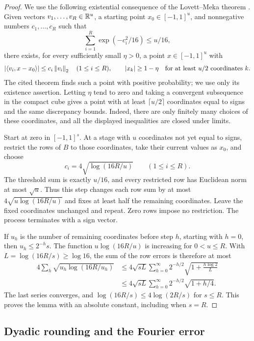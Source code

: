 \begin{proof}
We use the following existential consequence of the Lovett--Meka theorem
\cite[Theorem~4 of arXiv:1203.5747v2]{LovettMeka2015}.
Given vectors $v_1,\ldots,v_R\in\mathbb R^u$, a starting point
$x_0\in[-1,1]^u$, and
nonnegative numbers $c_1,\ldots,c_R$ such that
\[
 \sum_{i=1}^R\exp(-c_i^2/16)\le u/16,
\]
there exists, for every sufficiently small $\eta>0$, a point
$x\in[-1,1]^u$ with
\[
 |\langle v_i,x-x_0\rangle|\le c_i\left\lVert v_i\right\rVert_2
 \quad(1\le i\le R),
 \qquad
 |x_k|\ge1-\eta\quad\text{for at least }u/2\text{ coordinates }k.
\]
The cited theorem finds such a point with positive probability; we use
only its existence assertion.  Letting $\eta$ tend to zero and taking a
convergent subsequence in the compact cube gives a
point with at least $\lceil u/2\rceil$ coordinates equal to signs and the
same discrepancy bounds.  Indeed, there are only finitely many choices
of these coordinates, and all the displayed inequalities are closed
under limits.

Start at zero in $[-1,1]^s$.  At a stage with $u$ coordinates not yet
equal to signs, restrict the rows of $B$ to those coordinates, take their
current values as $x_0$, and choose
\[
 c_i=4\sqrt{\log(16R/u)}\qquad(1\le i\le R).
\]
The threshold sum is exactly $u/16$, and every restricted row has
Euclidean norm at most $\sqrt u$.  Thus this step changes each row sum
by at most $4\sqrt{u\log(16R/u)}$ and fixes at least half the remaining
coordinates.  Leave the fixed coordinates unchanged and repeat.
Zero rows impose no restriction.  The process terminates with a sign
vector.

If $u_h$ is the number of remaining coordinates before step $h$, starting
with $h=0$, then $u_h\le2^{-h}s$.  The function
$u\log(16R/u)$ is increasing for $0<u\le R$.  With
$L=\log(16R/s)\ge\log16$, the sum of the row errors is therefore at most
\[
 \begin{aligned}
 4\sum_h\sqrt{u_h\log(16R/u_h)}
 &\le4\sqrt{sL}\sum_{h=0}^{\infty}2^{-h/2}
       \sqrt{1+\frac{h\log2}{L}}\\
 &\le4\sqrt{sL}\sum_{h=0}^{\infty}2^{-h/2}\sqrt{1+h/4}.
 \end{aligned}
\]
The last series converges, and $\log(16R/s)\le4\log(2R/s)$ for $s\le R$.
This proves the lemma with an absolute constant, including when $s=R$.
\end{proof}

\subsection{Dyadic rounding and the Fourier error}

